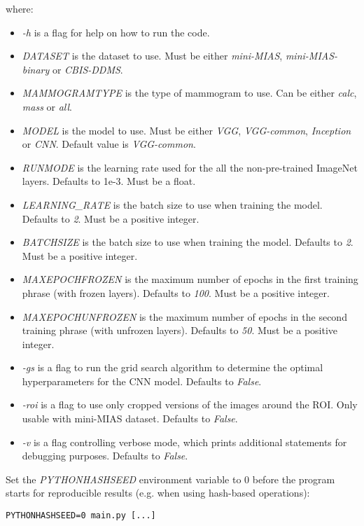 where:
\begin{itemize}
    \item \textit{-h} is a  flag for help on how to run the code.
    \item \textit{DATASET} is the dataset to use. Must be either \textit{mini-MIAS}, \textit{mini-MIAS-binary} or \textit{CBIS-DDMS}.
    \item \textit{MAMMOGRAMTYPE} is the type of mammogram to use. Can be either \textit{calc}, \textit{mass} or \textit{all}.
    \item \textit{MODEL} is the model to use. Must be either \textit{VGG}, \textit{VGG-common}, \textit{Inception} or \textit{CNN}. Default value is \textit{VGG-common}.
    \item \textit{RUNMODE} is the learning rate used for the all the non-pre-trained ImageNet layers. Defaults to 1e-3. Must be a float.
    \item \textit{LEARNING\_RATE} is the batch size to use when training the model. Defaults to \textit{2}. Must be a positive integer.
    \item \textit{BATCHSIZE} is the batch size to use when training the model. Defaults to \textit{2}. Must be a positive integer.
    \item \textit{MAXEPOCHFROZEN} is the maximum number of epochs in the first training phrase (with frozen layers). Defaults to \textit{100}. Must be a positive integer.
    \item \textit{MAXEPOCHUNFROZEN} is the maximum number of epochs in the second training phrase (with unfrozen layers). Defaults to \textit{50}. Must be a positive integer.
    \item \textit{-gs} is a flag to run the grid search algorithm to determine the optimal hyperparameters for the CNN model. Defaults to \textit{False}.
    \item \textit{-roi} is a flag to use only cropped versions of the images around the ROI. Only usable with mini-MIAS dataset. Defaults to \textit{False}.
    \item \textit{-v} is a flag controlling verbose mode, which prints additional statements for debugging purposes. Defaults to \textit{False}.
\end{itemize}

Set the \textit{PYTHONHASHSEED} environment variable to 0 before the program starts for reproducible results (e.g. when using hash-based operations):

\begin{lstlisting}
PYTHONHASHSEED=0 main.py [...]
\end{lstlisting}


